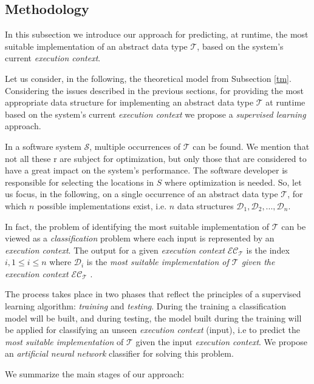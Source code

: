 \subsection{Methodology}\label{ann}

In this subsection we introduce our approach for predicting, at runtime, the most suitable implementation of an abstract data type $\mathcal{T}$, based on the system's current \emph{execution context}.

Let us consider, in the following, the theoretical model from Subsection \ref{tm}. Considering the issues described in the previous sections, for providing the most appropriate data structure for implementing an abstract data type $\mathcal{T}$ at runtime based on the system's current \emph{execution context} we propose a \emph{supervised learning} \cite{mitchell} approach.

In a software system $\mathcal{S}$, multiple occurrences of $\mathcal{T}$ can be found. We mention that not all these r are subject for optimization, but only those that are considered to have a great impact on the system's performance. The software developer is responsible for selecting the locations in $S$ where optimization is needed. So, let us focus, in the following, on a single occurrence of an abstract data type $\mathcal{T}$, for which $n$ possible implementations exist, i.e. $n$ data structures $\mathcal{D}_1, \mathcal{D}_2, ... , \mathcal{D}_n$.

In fact, the problem of identifying the most suitable implementation of $\mathcal{T}$ can be viewed as a \emph{classification} \cite{mitchell} problem where each input is represented by an \emph{execution context}. The output for a given \emph{execution context} $\mathcal{EC}_\mathcal{T}$ is the index $i, 1 \leq i \leq n$ where $\mathcal{D}_i$ is the \emph{most suitable implementation of $\mathcal{T}$ given the execution context $\mathcal{EC}_\mathcal{T}$} .

The process takes place in two phases that reflect the principles of a supervised learning algorithm: \emph{training} and \emph{testing}.  During the training a classification model will be built, and during testing, the model built during the training will be applied for classifying an unseen \emph{execution context} (input), i.e to predict the \emph{most suitable implementation} of $\mathcal{T}$ given the input \emph{execution context}.
We propose an \emph{artificial neural network} classifier for solving this problem. 

We summarize the main stages of our approach: 

